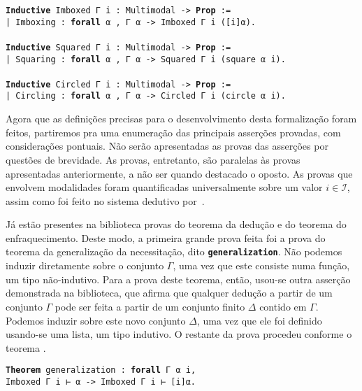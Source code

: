 \vspace{.5\baselineskip}
\begin{tcolorbox}[enhanced jigsaw, breakable, sharp corners, colframe=black, colback=white, boxrule=0.5pt, left=1.5mm, right=1.5mm, top=1.5mm, bottom=1.5mm]
\noindent
\texttt
{\noindent\footnotesize\textbf{Inductive} Imboxed Γ i : Multimodal -> \textbf{Prop} :=\\
| Imboxing : \textbf{forall} α , Γ α  -> Imboxed Γ i ([i]α).
\\
\\
\textbf{Inductive} Squared Γ i : Multimodal -> \textbf{Prop} :=\\
| Squaring : \textbf{forall} α , Γ α  -> Squared Γ i (square α i).
\\
\\
\textbf{Inductive} Circled Γ i : Multimodal -> \textbf{Prop} :=\\
| Circling : \textbf{forall} α , Γ α  -> Circled Γ i (circle α i).
}
\end{tcolorbox}
\vspace{.5\baselineskip}
Agora que as definições precisas para o desenvolvimento desta formalização foram feitos, partiremos pra uma enumeração das principais asserções provadas, com considerações pontuais.
Não serão apresentadas as provas das asserções por questões de brevidade.
As provas, entretanto, são paralelas às provas apresentadas anteriormente, a não ser quando destacado o oposto.
As provas que envolvem modalidades foram quantificadas universalmente sobre um valor $i\in\mathcal{I}$, assim como foi feito no sistema dedutivo por~\cite{Nunes}.

\vspace{.3\baselineskip}
Já estão presentes na biblioteca provas do teorema da dedução e do teorema do enfraquecimento.
Deste modo, a primeira grande prova feita foi a prova do teorema da generalização da necessitação, dito \texttt{\footnotesize\textbf{generalization}}.
Não podemos induzir diretamente sobre o conjunto $\Gamma$, uma vez que este consiste numa função, um tipo não-indutivo.
Para a prova deste teorema, então, usou-se outra asserção demonstrada na biblioteca, que afirma que qualquer dedução a partir de um conjunto $\Gamma$ pode ser feita a partir de um conjunto finito $\Delta$ contido em $\Gamma$.
Podemos induzir sobre este novo conjunto $\Delta$, uma vez que ele foi definido usando-se uma lista, um tipo indutivo.
O restante da prova procedeu conforme o teorema .

\vspace{.5\baselineskip}
\begin{tcolorbox}[enhanced jigsaw, breakable, sharp corners, colframe=black, colback=white, boxrule=0.5pt, left=1.5mm, right=1.5mm, top=1.5mm, bottom=1.5mm]
\texttt{\noindent\footnotesize\textbf{Theorem} generalization : \textbf{forall} Γ α i,\\Imboxed Γ i ⊢ α -> Imboxed Γ i ⊢ [i]α.}
\end{tcolorbox}

